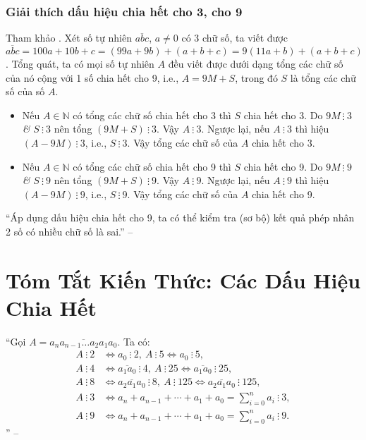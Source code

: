\documentclass{article}
\numberwithin{equation}{section}
\begin{document}
\subsubsection{Giải thích dấu hiệu chia hết cho 3, cho 9}
Tham khảo \cite[p. 40]{SGK_Toan_6_Canh_Dieu_tap_1}. Xét số tự nhiên $\overline{abc}$, $a\ne 0$ có 3 chữ số, ta viết được $\overline{abc} = 100a + 10b + c = (99a + 9b) + (a + b + c) = 9(11a + b) + (a + b + c)$. Tổng quát, ta có mọi số tự nhiên $A$ đều viết được dưới dạng tổng các chữ số của nó cộng với 1 số chia hết cho 9, i.e., $A = 9M + S$, trong đó $S$ là tổng các chữ số của số $A$.
\begin{itemize}
	\item Nếu $A\in\mathbb{N}$ có tổng các chữ số chia hết cho 3 thì $S$ chia hết cho 3. Do $9M\ \vdots\ 3$ \textit{\&} $S\ \vdots\ 3$ nên tổng $(9M + S)\ \vdots\ 3$. Vậy $A\ \vdots\ 3$. Ngược lại, nếu $A\ \vdots\ 3$ thì hiệu $(A - 9M)\ \vdots\ 3$, i.e., $S\ \vdots\ 3$. Vậy tổng các chữ số của $A$ chia hết cho 3.
	\item Nếu $A\in\mathbb{N}$ có tổng các chữ số chia hết cho 9 thì $S$ chia hết cho 9. Do $9M\ \vdots\ 9$ \textit{\&} $S\ \vdots\ 9$ nên tổng $(9M + S)\ \vdots\ 9$. Vậy $A\ \vdots\ 9$. Ngược lại, nếu $A\ \vdots\ 9$  thì hiệu $(A - 9M)\ \vdots\ 9$, i.e., $S\ \vdots\ 9$. Vậy tổng các chữ số của $A$ chia hết cho 9.
\end{itemize}
``Áp dụng dấu hiệu chia hết cho 9, ta có thể kiểm tra (sơ bộ) kết quả phép nhân 2 số có nhiều chữ số là sai.'' -- \cite[p. 40]{SGK_Toan_6_Canh_Dieu_tap_1}


\section*{Tóm Tắt Kiến Thức: Các Dấu Hiệu Chia Hết}
``Gọi $A = \overline{a_na_{n-1}\ldots a_2a_1a_0}$. Ta có:
\begin{align*}
	A\ \vdots\ 2&\Leftrightarrow a_0\ \vdots\ 2,\ A\ \vdots\ 5\Leftrightarrow a_0\ \vdots\ 5,\\
	A\ \vdots\ 4&\Leftrightarrow\overline{a_1a_0}\ \vdots\ 4,\ A\ \vdots\ 25\Leftrightarrow\overline{a_1a_0}\ \vdots\ 25,\\
	A\ \vdots\ 8&\Leftrightarrow\overline{a_2a_1a_0}\ \vdots\ 8,\ A\ \vdots\ 125\Leftrightarrow\overline{a_2a_1a_0}\ \vdots\ 125,\\
	A\ \vdots\ 3&\Leftrightarrow a_n + a_{n-1} + \cdots + a_1 + a_0 = \sum_{i=0}^n a_i\ \vdots\ 3,\\
	A\ \vdots\ 9&\Leftrightarrow a_n + a_{n-1} + \cdots + a_1 + a_0 = \sum_{i=0}^n a_i\ \vdots\ 9.
\end{align*}
'' -- \cite[\S4, p. 18]{Binh_Toan_6_tap_1}
\end{document}
